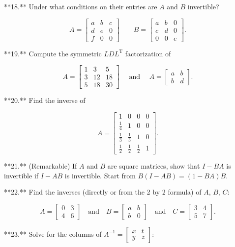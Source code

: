 

**18.** Under what conditions on their entries are \(A\) and \(B\) invertible?

\[A=\begin{bmatrix}a&b&c\\ d&e&0\\ f&0&0\end{bmatrix}\qquad B=\begin{bmatrix}a&b&0\\ c&d&0\\ 0&0&e\end{bmatrix}.\]

**19.** Compute the symmetric \(LDL^{\mathrm{T}}\) factorization of

\[A=\begin{bmatrix}1&3&5\\ 3&12&18\\ 5&18&30\end{bmatrix}\quad\text{ and }\quad A=\begin{bmatrix}a&b\\ b&d\end{bmatrix}.\]

**20.** Find the inverse of

\[A=\begin{bmatrix}1&0&0&0\\ \frac{1}{4}&1&0&0\\ \frac{1}{3}&\frac{1}{3}&1&0\\ \frac{1}{2}&\frac{1}{2}&\frac{1}{2}&1\end{bmatrix}.\]

**21.** (Remarkable) If \(A\) and \(B\) are square matrices, show that \(I-BA\) is invertible if \(I-AB\) is invertible. Start from \(B(I-AB)=(1-BA)B\).

**22.** Find the inverses (directly or from the 2 by 2 formula) of \(A\), \(B\), \(C\):

\[A=\begin{bmatrix}0&3\\ 4&6\end{bmatrix}\quad\text{and}\quad B=\begin{bmatrix}a&b\\ b&0\end{bmatrix}\quad\text{and}\quad C=\begin{bmatrix}3&4\\ 5&7\end{bmatrix}.\]

**23.** Solve for the columns of \(A^{-1}=\begin{bmatrix}x&t\\ y&z\end{bmatrix}\):

